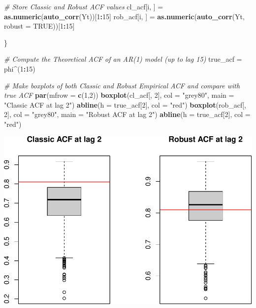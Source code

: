 \documentclass[]{book}
\newenvironment{Shaded}{\begin{snugshade}}{\end{snugshade}}
\newcommand{\KeywordTok}[1]{\textcolor[rgb]{0.13,0.29,0.53}{\textbf{#1}}}
\newcommand{\DataTypeTok}[1]{\textcolor[rgb]{0.13,0.29,0.53}{#1}}
\newcommand{\DecValTok}[1]{\textcolor[rgb]{0.00,0.00,0.81}{#1}}
\newcommand{\StringTok}[1]{\textcolor[rgb]{0.31,0.60,0.02}{#1}}
\newcommand{\CommentTok}[1]{\textcolor[rgb]{0.56,0.35,0.01}{\textit{#1}}}
\newcommand{\OtherTok}[1]{\textcolor[rgb]{0.56,0.35,0.01}{#1}}
\newcommand{\OperatorTok}[1]{\textcolor[rgb]{0.81,0.36,0.00}{\textbf{#1}}}
\newcommand{\NormalTok}[1]{#1}
\theoremstyle{definition}
\theoremstyle{definition}
\theoremstyle{definition}
\theoremstyle{remark}
\begin{document}
\begin{Shaded}
\begin{Highlighting}[]
  \CommentTok{# Store Classic and Robust ACF values}
\NormalTok{  cl_acf[i, ] =}\StringTok{ }\KeywordTok{as.numeric}\NormalTok{(}\KeywordTok{auto_corr}\NormalTok{(Yt))[}\DecValTok{1}\OperatorTok{:}\DecValTok{15}\NormalTok{]}
\NormalTok{  rob_acf[i, ] =}\StringTok{ }\KeywordTok{as.numeric}\NormalTok{(}\KeywordTok{auto_corr}\NormalTok{(Yt, }\DataTypeTok{robust =} \OtherTok{TRUE}\NormalTok{))[}\DecValTok{1}\OperatorTok{:}\DecValTok{15}\NormalTok{]}
  
\NormalTok{\}}

\CommentTok{# Compute the Theoretical ACF of an AR(1) model (up to lag 15)}
\NormalTok{true_acf =}\StringTok{ }\NormalTok{phi}\OperatorTok{^}\NormalTok{(}\DecValTok{1}\OperatorTok{:}\DecValTok{15}\NormalTok{)}

\CommentTok{# Make boxplots of both Classic and Robust Empirical ACF and compare with true ACF}
\KeywordTok{par}\NormalTok{(}\DataTypeTok{mfrow =} \KeywordTok{c}\NormalTok{(}\DecValTok{1}\NormalTok{,}\DecValTok{2}\NormalTok{))}
\KeywordTok{boxplot}\NormalTok{(cl_acf[, }\DecValTok{2}\NormalTok{], }\DataTypeTok{col =} \StringTok{"grey80"}\NormalTok{, }\DataTypeTok{main =} \StringTok{"Classic ACF at lag 2"}\NormalTok{)}
\KeywordTok{abline}\NormalTok{(}\DataTypeTok{h =}\NormalTok{ true_acf[}\DecValTok{2}\NormalTok{], }\DataTypeTok{col =} \StringTok{"red"}\NormalTok{)}
\KeywordTok{boxplot}\NormalTok{(rob_acf[, }\DecValTok{2}\NormalTok{], }\DataTypeTok{col =} \StringTok{"grey80"}\NormalTok{, }\DataTypeTok{main =} \StringTok{"Robust ACF at lag 2"}\NormalTok{)}
\KeywordTok{abline}\NormalTok{(}\DataTypeTok{h =}\NormalTok{ true_acf[}\DecValTok{2}\NormalTok{], }\DataTypeTok{col =} \StringTok{"red"}\NormalTok{)}
\end{Highlighting}
\end{Shaded}

\includegraphics{ts_files/figure-latex/simulationRobust2-1.pdf}
\end{document}
